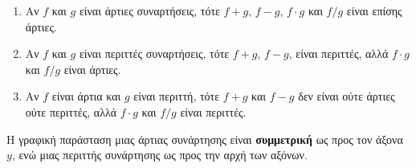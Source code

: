 \documentclass[a4paper,table]{report}
\begin{document}
\begin{prop}\label{prop:praxartper}
\item {}
  \begin{enumerate}
    \item Αν $ f $ και $g$ είναι \textcolor{Col1}{άρτιες} συναρτήσεις, τότε 
      $ f+ g $, $ f-g $, $ f\cdot g $ και $ f/g $  είναι επίσης
      \textcolor{Col1}{άρτιες.} \label{prop:ginart}
    \item Αν $ f $ και $g$ είναι \textcolor{Col1}{περιττές} συναρτήσεις, τότε 
      $ f+ g $, $ f-g $, είναι \textcolor{Col1}{περιττές,} αλλά 
      $ f\cdot g $ και $ f/g $ είναι \textcolor{Col1}{άρτιες}. \label{prop:ginper}
    \item Αν $f$ είναι \textcolor{Col1}{άρτια} και $ g $ είναι
      \textcolor{Col1}{περιττή}, τότε $ f+g $ και $ f-g $ 
      δεν είναι ούτε άρτιες ούτε περιττές, αλλά $ f\cdot g $ και $ f/g $ είναι 
      \textcolor{Col1}{περιττές}.
      \label{prop:ginartper}
  \end{enumerate}
\end{prop}

\begin{rem}
  Η γραφική παράσταση μιας άρτιας συνάρτησης είναι \textbf{συμμετρική} ως προς τον 
  \textcolor{Col1}{άξονα $y$}, ενώ μιας περιττής συνάρτησης ως προς την
  \textcolor{Col1}{αρχή των αξόνων}.
\end{rem}
\end{document}
